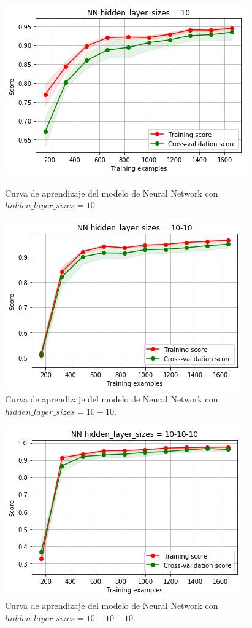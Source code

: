 \documentclass[11pt,a4paper]{article}
\begin{document}
\begin{figure}[H]
\centering
\begin{minipage}{.5\textwidth}
    \centering
    \includegraphics[scale=0.4]{img/lc-nn-10.png}
    \caption{Curva de aprendizaje del modelo de Neural Network con $hidden\_layer\_sizes=10$.}
    \label{fig:lc-nn-10}
\end{minipage}%
\begin{minipage}{.5\textwidth}
    \centering
    \includegraphics[scale=0.4]{img/lc-nn-10-10.png}
    \caption{Curva de aprendizaje del modelo de Neural Network con $hidden\_layer\_sizes=10-10$.}
    \label{fig:lc-nn-10-10}
\end{minipage}
\end{figure}

\begin{figure}[H]
    \centering
    \includegraphics[scale=0.5]{img/lc-nn-10-10-10.png}
    \caption{Curva de aprendizaje del modelo de Neural Network con $hidden\_layer\_sizes=10-10-10$.}
    \label{fig:lc-nn-10-10-10}
\end{figure}
\end{document}
